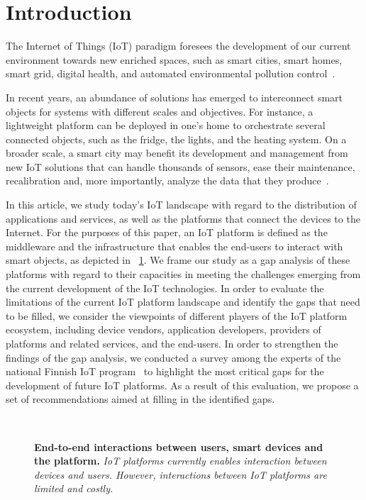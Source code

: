\documentclass[preprint,10pt,5p]{elsarticle}
\begin{document}
\section{Introduction}\label{sec:introduction}

The Internet of Things (IoT) paradigm foresees the
development of our current environment towards new enriched spaces,
such as smart cities, smart homes, smart grid, digital health, and automated environmental pollution
control~\cite{Borgia2014,Atzori2010}.

In recent years, an abundance of solutions has emerged to interconnect
smart objects for systems with different scales and objectives. 
For instance, a lightweight platform can be deployed in one's home to 
orchestrate several connected objects, such as the fridge, the lights, and the heating system. 
On a broader scale, a smart city may benefit its development and
management from new IoT solutions that can handle thousands of
sensors, ease their maintenance, recalibration and, more importantly,
analyze the data that they produce~\cite{Lea2014a,Tsai2014}.

In this article, we study today's IoT landscape with regard to the
distribution of applications and services, as well as the platforms
that connect the devices to the Internet. For the purposes of this
paper, an IoT platform is defined as the middleware and the
infrastructure that enables the end-users to interact with smart
objects, as depicted in \figurename{~\ref{fig:siloed_architectures}}.
We frame our study as a gap analysis of these platforms with regard to
their capacities in meeting the challenges emerging from the current
development of the IoT technologies. 
In order to evaluate the limitations of the current IoT platform
landscape and identify the gaps that need to be filled, we consider
the viewpoints of different players of the IoT platform ecosystem,
including device vendors, application developers, providers of
platforms and related services, and the end-users.
In order to strengthen the findings of the gap analysis, we conducted
a survey among the experts of the national Finnish IoT
program~\cite{Tarkoma2013} to highlight the most critical gaps for the
development of future IoT platforms.
As a result of this evaluation, we propose a set of recommendations
aimed at filling in the identified gaps.

\begin{figure}[tb]
 \centering
  \hfill
   \\
 \caption{
 	\textbf{End-to-end interactions between users, smart devices and the platform.}
 	\textsl{IoT platforms currently enables interaction between devices and users. 
    However, interactions between IoT platforms are limited and costly.}
 }
 \label{fig:siloed_architectures}
\end{figure}
\end{document}
